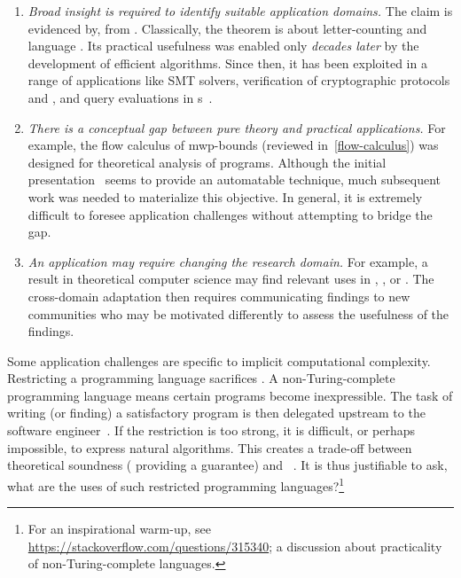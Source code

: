 \begin{enumerate}

\item \emph{Broad insight is required to identify suitable application domains.}
      The claim is evidenced by, \eg {} from . Classically, the theorem is about letter-counting and language
      . Its practical usefulness was enabled only
      \emph{decades later} by the development of efficient algorithms. Since
      then, it has been exploited in a range of applications like SMT solvers,
      verification of cryptographic protocols and
      , and query evaluations in s~\cite[pg. 2]{hague2024}.

\item \emph{There is a conceptual gap between pure theory and practical
      applications.}
      For example, the flow calculus of mwp-bounds (reviewed
      in~\autoref{flow-calculus}) was designed for theoretical analysis of
      programs. Although the initial presentation~\cite{jones2009} seems to
      provide an automatable technique, much subsequent work was needed to
      materialize this objective. In general, it is extremely difficult to
      foresee application challenges without attempting to bridge the gap.

\item \emph{An application may require changing the research domain.}
      For example, a result in theoretical computer science may find relevant
      uses in , , or
      . The cross-domain adaptation then requires
      communicating findings to new communities who may be motivated differently
      to assess the usefulness of the findings.

\end{enumerate}

Some application challenges are specific to implicit computational complexity.
Restricting a programming language sacrifices . A
non-Turing-complete programming language means certain programs become
inexpressible. The task of writing (or finding) a satisfactory program is then
delegated upstream to the software engineer~\cite[p. 14]{moyen2017}. If the
restriction is too strong, it is difficult, or perhaps impossible, to express
natural algorithms. This creates a trade-off between theoretical soundness (\ie
providing a guarantee) and ~\cite{feree2018}. It is thus
justifiable to ask, what are the uses of such restricted programming
languages?\footnote{For an inspirational warm-up, see
\url{https://stackoverflow.com/questions/315340}; a discussion about
practicality of non-Turing-complete languages.}

